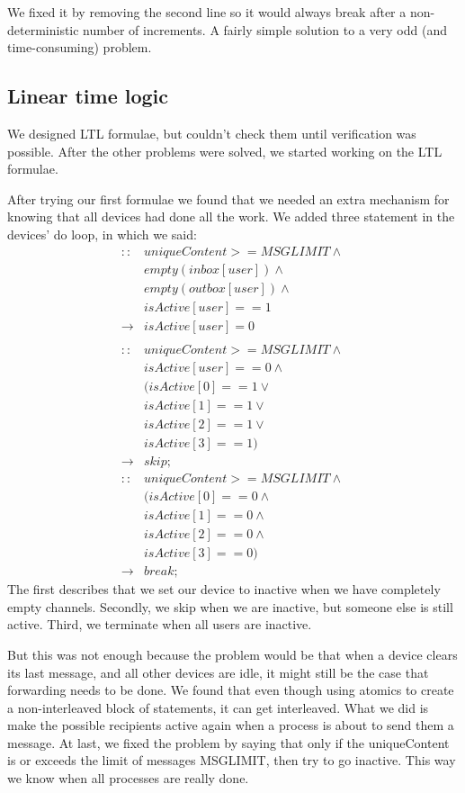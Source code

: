 \documentclass[10pt,a4paper]{article}
\begin{document}
	We fixed it by removing the second line so it would always break after a non-deterministic number of increments. A fairly simple solution to a very odd (and time-consuming) problem.
	
	\subsection{Linear time logic}
	We designed LTL formulae, but couldn't check them until verification was possible.
	After the other problems were solved, we started working on the LTL formulae.
	
	After trying our first formulae we found that we needed an extra mechanism for knowing that all devices had done all the work.
	We added three statement in the devices' do loop, in which we said:
	\begin{align*}
	:: & uniqueContent >= MSGLIMIT \wedge\ \\
	   & empty(inbox[user]) \wedge\ \\
	   & empty(outbox[user]) \wedge\ \\
	   & isActive[user] == 1 \\
	\rightarrow & isActive[user] = 0 \\
	\\
	:: & uniqueContent >= MSGLIMIT \wedge\ \\
	   & isActive[user] == 0  \wedge\ \\ 
	   & (isActive[0] == 1 \vee\ \\ 
	   & isActive[1] == 1 \vee\ \\ 
	   & isActive[2] == 1 \vee\ \\
	   & isActive[3] == 1) \\
	\rightarrow & skip;
	\\
	::  & uniqueContent >= MSGLIMIT \wedge\ \\
	    & (isActive[0] == 0 \wedge\ \\ 
		& isActive[1] == 0 \wedge\ \\ 
		& isActive[2] == 0 \wedge\ \\
		& isActive[3] == 0) \\
		\rightarrow & break;
	\end{align*}
	The first describes that we set our device to inactive when we have completely empty channels.
	Secondly, we skip when we are inactive, but someone else is still active.
	Third, we terminate when all users are inactive.
	
	But this was not enough because the problem would be that when a device clears its last message, and all other devices are idle, it might still be the case that forwarding needs to be done.
	We  found that even though using atomics to create a non-interleaved block of statements, it can get interleaved.
	What we did is make the possible recipients active again when a process is about to send them a message.
	At last, we fixed the problem by saying that only if the uniqueContent is or exceeds the limit of messages MSGLIMIT, then try to go inactive.
	This way we know when all processes are really done.
	
\end{document}
